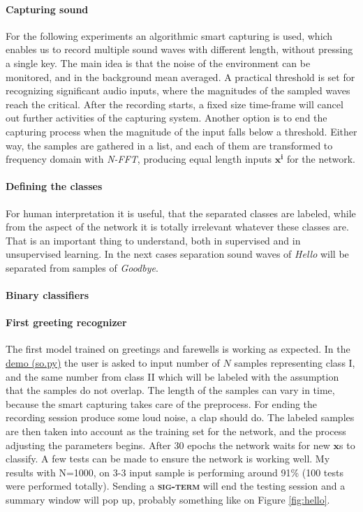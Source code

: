 \paragraph{Capturing sound}
For the following experiments an algorithmic smart capturing is used, which enables us to record multiple sound waves with different length, without pressing a single key. The main idea is that the noise of the environment can be monitored, and in the background mean averaged. A practical threshold is set for recognizing significant audio inputs, where the magnitudes of the sampled waves reach the critical. After the recording starts, a fixed size time-frame will cancel out further activities of the capturing system. Another option is to end the capturing process when the magnitude of the input falls below a threshold. Either way, the samples are gathered in a list, and each of them are transformed to frequency domain with \emph{N-FFT}, producing equal length inputs  $\mathbf{x^i}$ for the network.

\paragraph{Defining the classes}
For human interpretation it is useful, that the separated classes are labeled, while from the aspect of the network it is totally irrelevant whatever these classes are. That is an important thing to understand, both in supervised and in unsupervised learning. In the next cases separation sound waves of \emph{Hello} will be separated from samples of \emph{Goodbye}.

\paragraph{Binary classifiers}
\paragraph{First greeting recognizer}
The first model trained on greetings and farewells is working as expected. In the \href{https://github.com/botcs/deepvision/tree/master/demo/audio}{demo (so.py)} the user is asked to input number of $N$ samples representing class I, and the same number from class II which will be labeled with the assumption that the samples do not overlap. The length of the samples can vary in time, because the smart capturing takes care of the preprocess. For ending the recording session produce some loud noise, a clap should do. The labeled samples are then taken into account as the training set for the network, and the process adjusting the parameters begins. After 30 epochs the network waits for new $\mathbf{x}$s to classify. A few tests can be made to ensure the network is working well. My results with N=1000, on 3-3 input sample is performing around 91\% (100 tests were performed totally). Sending a \textbf{\textsc{sig-term}} will end the testing session and a summary window will pop up, probably something like on Figure \ref{fig:hello}.



